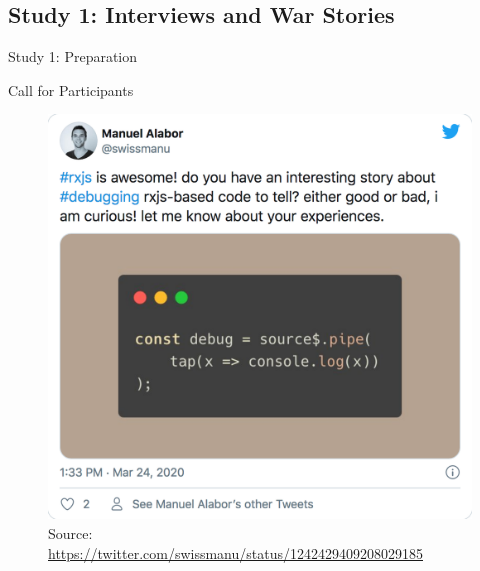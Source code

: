 \documentclass[aspectratio=169]{beamer}
\begin{document}
\subsection{Study 1: Interviews and War Stories}

\begin{frame}{Study 1: Preparation}
  \centering
  \vfill
  {\fontsize{30}{40}\selectfont\color{white}{Interviews\\and War Stories}}
  \vfill
\end{frame}

\begin{frame}[fragile]{Call for Participants}
    \begin{figure}[H]
        \centering
        \includegraphics[height=0.6\textheight]{figures/tweet-interview.png}
        \caption{\tiny{Source: \url{https://twitter.com/swissmanu/status/1242429409208029185}}}
    \end{figure}
\end{frame}

\end{document}
